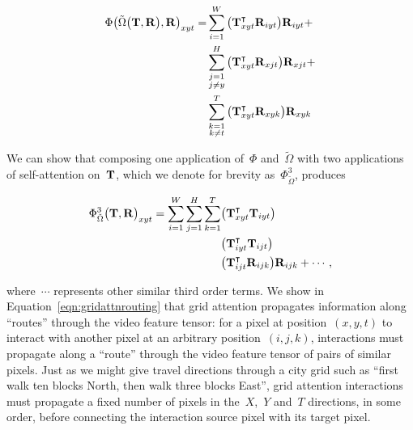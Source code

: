 \begin{equation}
\begin{split}
        \Phi{\big({\tilde{\Omega}\big(\mathbf{T}{}, \mathbf{R}{}\big)}, \mathbf{R}{}\big)}_{xyt} =
        & \sum_{i = 1}^W \big(\mathbf{T}{}_{xyt}^\intercal\mathbf{R}{}_{iyt}\big)\mathbf{R}{}_{iyt} + \\
        & \sum_{\substack{j = 1 \\ j \neq y}}^H \big(\mathbf{T}{}_{xyt}^\intercal \mathbf{R}{}_{xjt}\big)\mathbf{R}{}_{xjt} + \\
        & \sum_{\substack{k = 1 \\ k \neq t}}^T \big(\mathbf{T}{}_{xyt}^\intercal \mathbf{R}{}_{xyk}\big)\mathbf{R}{}_{xyk}
\end{split}
\end{equation}

We can show that composing one application of~$\Phi$ and~$\tilde{\Omega}$ with
two applications of self-attention on~$\mathbf{T}{}$, which we denote for brevity
as~$\Phi^3_{\tilde{\Omega}}$, produces

\begin{equation}
\begin{split}
        {\Phi^3_{\tilde{\Omega}}\big(\mathbf{T}{}, \mathbf{R}{}\big)}_{xyt} =
                \sum_{i = 1}^W \sum_{j = 1}^H \sum_{k = 1}^T
                & \big(\mathbf{T}{}_{xyt}^\intercal\mathbf{T}{}_{iyt}\big) \\
                & \big(\mathbf{T}{}_{iyt}^\intercal \mathbf{T}{}_{ijt}\big) \\
                & \big(\mathbf{T}{}_{ijt}^\intercal \mathbf{R}{}_{ijk}\big)\mathbf{R}{}_{ijk} + \cdots,
\end{split}
\label{eqn:gridattnrouting}
\end{equation}

where~$\cdots$ represents other similar third order terms.
We show in Equation~\ref{eqn:gridattnrouting} that grid attention propagates
information along ``routes'' through the video feature tensor: for a pixel at
position~$(x, y, t)$ to interact with another pixel at an arbitrary
position~$(i, j, k)$, interactions must propagate along a ``route''  through
the video feature tensor of pairs of similar pixels.
Just as we might give travel directions through a city grid such as ``first
walk ten blocks North, then walk three blocks East'', grid attention
interactions must propagate a fixed number of pixels in the~$X$,~$Y$ and~$T$
directions, in some order, before connecting the interaction source pixel with
its target pixel.


